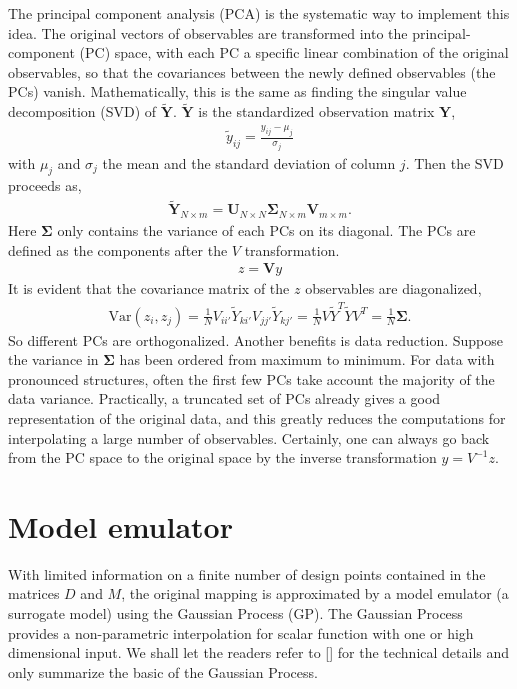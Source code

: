 The principal component analysis (PCA) is the systematic way to implement this idea.
The original vectors of observables are transformed into the principal-component (PC) space, with each PC a specific linear combination of the original observables, so that the covariances between the newly defined observables (the PCs) vanish.
Mathematically, this is the same as finding the singular value decomposition (SVD) of $\mathbf{\tilde{Y}}$. 
$\mathbf{\tilde{Y}}$ is the standardized observation matrix $\mathbf{Y}$,
\begin{eqnarray}
\tilde{y}_{ij} = \frac{y_{ij} - \mu_j}{\sigma_j}
\end{eqnarray}
with $\mu_j$ and $\sigma_j$ the mean and the standard deviation of column $j$.
Then the SVD proceeds as,
\begin{eqnarray}
\tilde{\mathbf{Y}}_{N\times m} = \mathbf{U}_{N\times N} \mathbf{\Sigma}_{N\times m} \mathbf{V}_{m\times m}.
\end{eqnarray}
Here $\mathbf{\Sigma}$ only contains the variance of each PCs on its diagonal.
The PCs are defined as the components after the $V$ transformation.
\begin{eqnarray}
z = \mathbf{V}y
\end{eqnarray}
It is evident that the covariance matrix of the $z$ observables are diagonalized,
\begin{eqnarray}
\mathrm{Var}(z_i, z_j) = \frac{1}{N}V_{ii'}\tilde{Y}_{ki'}V_{jj'}\tilde{Y}_{kj'} = \frac{1}{N}V\tilde{Y}^T\tilde{Y}V^T = \frac{1}{N}\mathbf{\Sigma}.
\end{eqnarray}
So different PCs are orthogonalized.
Another benefits is data reduction. 
Suppose the variance in $\mathbf{\Sigma}$ has been ordered from maximum to minimum.
For data with pronounced structures, often the first few PCs take account the majority of the data variance.
Practically, a truncated set of PCs already gives a good representation of the original data, and this greatly reduces the computations for interpolating a large number of observables.
Certainly, one can always go back from the PC space to the original space by the inverse transformation $y = V^{-1} z$.

\section{Model emulator}
With limited information on a finite number of design points contained in the matrices $D$ and $M$, the original mapping is approximated by a model emulator (a surrogate model) using the Gaussian Process (GP).
The Gaussian Process provides a non-parametric interpolation for scalar function with one or high dimensional input.
We shall let the readers refer to [] for the technical details and only summarize the basic of the Gaussian Process.

